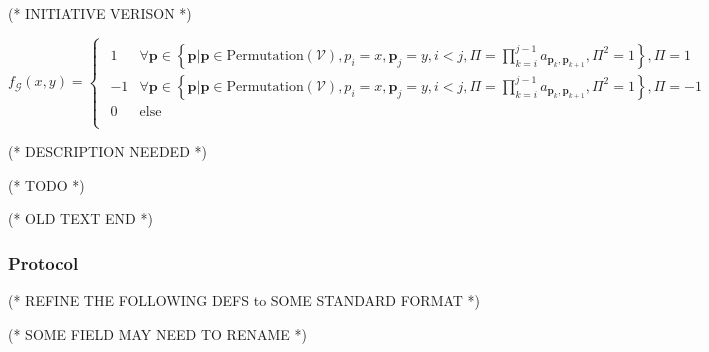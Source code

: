 \documentclass{article}
\begin{document}
(* INITIATIVE VERISON *)





\(f_{\mathcal{G}}(x,y)=\begin{cases}
 
\begin{array}{ll}
 1 & \forall \pmb{p}\in \left\{\pmb{p}|\pmb{p}\in \text{Permutation}(\mathcal{V}),p_i=x,\pmb{p}_j=y,i<j,\Pi =\prod _{k=i}^{j-1} a_{\pmb{p}_k,\pmb{p}_{k+1}},\Pi
^2=1\right\},\Pi =1 \\
 -1 & \forall \pmb{p}\in \left\{\pmb{p}|\pmb{p}\in \text{Permutation}(\mathcal{V}),p_i=x,\pmb{p}_j=y,i<j,\Pi =\prod _{k=i}^{j-1} a_{\pmb{p}_k,\pmb{p}_{k+1}},\Pi
^2=1\right\},\Pi =-1 \\
 0 & \text{else} \\
\end{array}

\end{cases}\)





(* DESCRIPTION NEEDED *)



(* TODO *)



(* OLD TEXT END *)


\subsubsection{Protocol}



(* REFINE THE FOLLOWING DEFS to SOME STANDARD FORMAT *)



(* SOME FIELD MAY NEED TO RENAME *)
\end{document}
